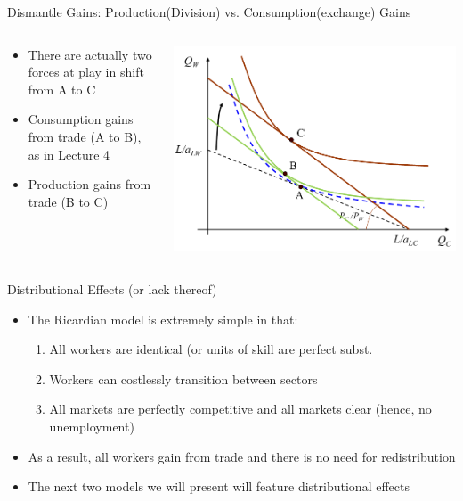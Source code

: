 \documentclass[10pt,hyperref={CJKbookmarks=true},xcolor=dvipsnames,aspectratio=169]{beamer}
\begin{document}
\begin{frame}{Dismantle Gains: Production(Division) vs. Consumption(exchange) Gains}


\begin{columns}[onlytextwidth]
\begin{column}{0.4\textwidth}
\begin{itemize}
\item There are actually two forces at play in shift from A to C 
\item Consumption gains from trade (A to B), as in Lecture 4 
\item Production gains from trade (B to C)
\end{itemize}

\end{column}
\begin{column}{0.6\textwidth}
\includegraphics[width=\columnwidth]{fig/ricardo/lec3-13}
\end{column}
\end{columns}

\end{frame}

\begin{frame}{Distributional Effects (or lack thereof) }

\begin{itemize}
\item The Ricardian model is extremely simple in that: 

\begin{enumerate}
\item All workers are identical (or units of skill are perfect subst. 
\item Workers can costlessly transition between sectors 
\item All markets are perfectly competitive and all markets clear (hence,
no unemployment) 
\end{enumerate}
\item As a result, all workers gain from trade and there is no need for
redistribution 
\item The next two models we will present will feature distributional effects 
\end{itemize}
\end{frame}
\end{document}
